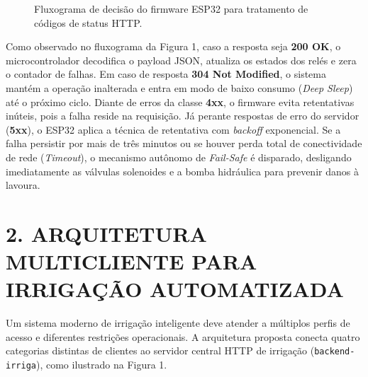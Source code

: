 \begin{figure}[h!]
\caption{Fluxograma de decisão do firmware ESP32 para tratamento de códigos de status HTTP.}
\end{figure}

\vspace{1em}

Como observado no fluxograma da Figura 1, caso a resposta seja \textbf{200 OK}, o microcontrolador decodifica o payload JSON, atualiza os estados dos relés e zera o contador de falhas. Em caso de resposta \textbf{304 Not Modified}, o sistema mantém a operação inalterada e entra em modo de baixo consumo (\textit{Deep Sleep}) até o próximo ciclo. Diante de erros da classe \textbf{4xx}, o firmware evita retentativas inúteis, pois a falha reside na requisição. Já perante respostas de erro do servidor (\textbf{5xx}), o ESP32 aplica a técnica de retentativa com \textit{backoff} exponencial. Se a falha persistir por mais de três minutos ou se houver perda total de conectividade de rede (\textit{Timeout}), o mecanismo autônomo de \textit{Fail-Safe} é disparado, desligando imediatamente as válvulas solenoides e a bomba hidráulica para prevenir danos à lavoura.

\newpage

\section*{2. ARQUITETURA MULTICLIENTE PARA IRRIGAÇÃO AUTOMATIZADA}

Um sistema moderno de irrigação inteligente deve atender a múltiplos perfis de acesso e diferentes restrições operacionais. A arquitetura proposta conecta quatro categorias distintas de clientes ao servidor central HTTP de irrigação (\texttt{backend-irriga}), como ilustrado na Figura 1.

\vspace{1em}


